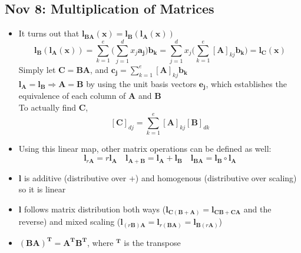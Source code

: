 \documentclass[10pt, oneside]{article}
\renewcommand{\vec}[1]{\mathbf{#1}}
\newcommand{\vecf}[1]{\boldsymbol{#1}}
\newcommand{\mat}[1]{\mathbf{#1}}
\begin{document}
\subsection{Nov 8: Multiplication of Matrices}
\begin{itemize}
    \item It turns out that $\vecf{l}_{\mat{B}\mat{A}}(\vec{x}) = \vecf{l}_\mat{B}(\vecf{l}_\mat{A}(\vec{x}))$
        \[\vecf{l}_\mat{B}(\vecf{l}_\mat{A}(\vec{x})) = \sum_{k=1}^e \bigg( \sum_{j=1}^{d} x_j \vec{a_j} \bigg) \vec{b_k} = \sum_{j=1}^d x_j \bigg( \sum_{k=1}^{e} [\mat{A}]_{kj} \vec{b_k} \bigg) = \vecf{l}_\mat{C} (\vec{x})\]
        Simply let $\mat{C} = \mat{B}\mat{A}$, and $\vec{c_j} = \sum_{k=1}^{e}[\mat{A}]_{kj} \vec{b_k}$\\
        $\vecf{l}_\mat{A} = \vecf{l}_\mat{B} \Rightarrow \mat{A} = \mat{B}$ by using the unit basis vectors $\vec{e_j}$, which establishes the equivalence of each column of $\mat{A}$ and $\mat{B}$\\
        To actually find $\mat{C}$,
        \[[\mat{C}]_{dj} = \sum_{k=1}^{e} [\mat{A}]_{kj} [\mat{B}]_{dk}\]
    \item Using this linear map, other matrix operations can be defined as well:
        \[\vecf{l}_{r\mat{A}} = r\vecf{l}_\mat{A} \quad \vecf{l}_{\mat{A}+\mat{B}} = \vecf{l}_\mat{A} + \vecf{l}_\mat{B} \quad \vecf{l}_{\mat{B}\mat{A}} = \vecf{l}_\mat{B} \circ \vecf{l}_\mat{A}\]
    \item $\vecf{l}$ is additive (distributive over +) and homogenous (distributive over scaling) so it is linear
    \item $\vecf{l}$ follows matrix distribution both ways ($\vecf{l}_{\mat{C}(\mat{B}+\mat{A})} = \vecf{l}_{\mat{C}\mat{B} + \mat{C}\mat{A}}$ and the reverse) and mixed scaling ($\vecf{l}_{(r\mat{B})\mat{A}} = \vecf{l}_{r(\mat{B}\mat{A})} = \vecf{l}_{\mat{B}(r\mat{A})}$)
    \item $(\mat{B}\mat{A})^\mat{T} = \mat{A^T} \mat{B^T}$, where $^\mat{T}$ is the transpose
\end{itemize}
\end{document}
